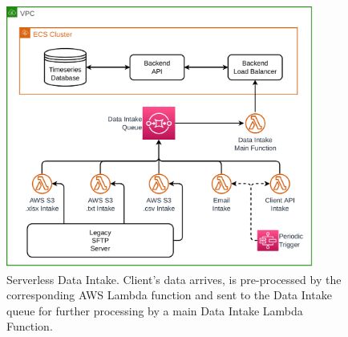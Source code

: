 \begin{figure}[!htbp]
    \centering
    \includegraphics[width=0.90\textwidth]{img/diagrams/pdf/data-intake.drawio.pdf}
    \caption[Serverless Data Intake]{Serverless Data Intake. Client's data arrives, is pre-processed by the corresponding AWS Lambda function and sent to the Data Intake queue for further processing by a main Data Intake Lambda Function.}
    \label{fig:data-intake}
\end{figure}
